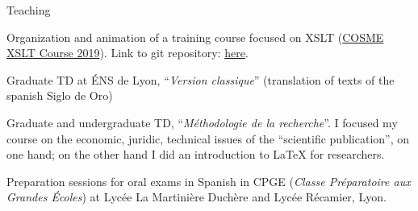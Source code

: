 










\begin{rubric}{Teaching}
                                \entry*[2018-2019]
                                
                            Organization and animation of a training course focused on XSLT (\href{https://cosme.hypotheses.org/1117}{COSME XSLT Course 2019}).
                        Link to git repository: \href{https://github.com/gabays/Cours\_COSME\_2019}{here}.
                    
                                \entry*
                            Graduate TD at ÉNS de Lyon, \enquote{\textit{Version classique}}
                        (translation of texts of the spanish Siglo de Oro)
                    
                                \entry*
                            Graduate and undergraduate TD, \enquote{\textit{Méthodologie de la
                        recherche}}. I focused my course on the economic, juridic,
                        technical issues of the \enquote{scientific publication}, on one hand; on
                        the other hand I did an introduction to LaTeX for researchers.
                    
                                \entry*[2017-2018]
                                
                            Preparation sessions for oral exams in Spanish in CPGE (\textit{Classe
                        Préparatoire aux Grandes Écoles}) at Lycée La Martinière Duchère and
                        Lycée Récamier, Lyon.
                    \end{rubric}


